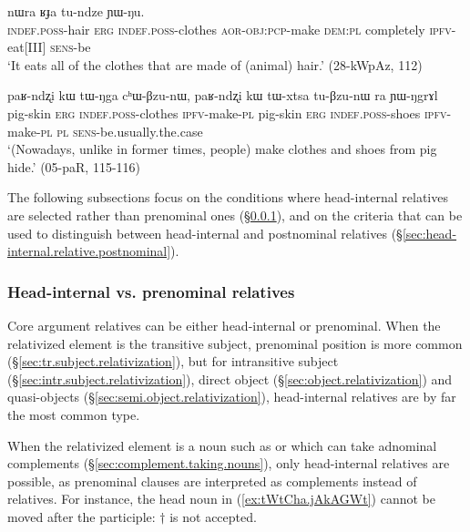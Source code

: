 \begin{exe}
\ex \label{ex:tWNga.thWkABzu}
 nɯra ʁɟa tu-ndze ɲɯ-ŋu. \\
\textsc{indef}.\textsc{poss}-hair \textsc{erg} \textsc{indef}.\textsc{poss}-clothes \textsc{aor}-\textsc{obj}:\textsc{pcp}-make \textsc{dem}:\textsc{pl} completely \textsc{ipfv}-eat[III] \textsc{sens}-be \\
\glt `It eats all of the clothes that are made of (animal) hair.' (28-kWpAz, 112)
\end{exe} 

\begin{exe}
\ex \label{ex:tWNga.chWBzunW}
\gll paʁ-ndʐi kɯ tɯ-ŋga cʰɯ-βzu-nɯ, paʁ-ndʐi kɯ tɯ-xtsa tu-βzu-nɯ ra ɲɯ-ŋgrɤl \\
pig-skin \textsc{erg} \textsc{indef}.\textsc{poss}-clothes \textsc{ipfv}-make-\textsc{pl} pig-skin \textsc{erg} \textsc{indef}.\textsc{poss}-shoes \textsc{ipfv}-make-\textsc{pl} \textsc{pl} \textsc{sens}-be.usually.the.case \\
\glt `(Nowadays, unlike in former times, people) make clothes and shoes from pig hide.' (05-paR, 115-116)
\end{exe} 

The following subsections focus on the conditions where head-internal relatives are selected rather than prenominal ones (§\ref{sec:head-internal.relative.prenominal}), and on the criteria that can be used to distinguish between head-internal and postnominal relatives (§\ref{sec:head-internal.relative.postnominal}).

\subsubsection{Head-internal vs. prenominal relatives} \label{sec:head-internal.relative.prenominal}
Core argument relatives can be either head-internal or prenominal. When the relativized element is the transitive subject, prenominal position is more common (§\ref{sec:tr.subject.relativization}), but for intransitive subject (§\ref{sec:intr.subject.relativization}), direct object (§\ref{sec:object.relativization}) and quasi-objects (§\ref{sec:semi.object.relativization}), head-internal relatives are by far the most common type. 

When the relativized element is a noun such as  or  which can take adnominal complements (§\ref{sec:complement.taking.nouns}), only head-internal relatives are possible, as prenominal clauses are interpreted as complements instead of relatives. For instance, the head noun  in  (\ref{ex:tWtCha.jAkAGWt}) cannot be moved after the participle: $\dagger$ is not accepted.

